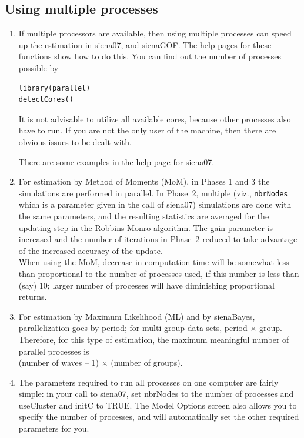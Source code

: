 \documentclass[a4paper,fleqn,11pt]{article}
\newcommand{\+}{\, + \,}
\newcommand{\sfn}[1]{\textsf{#1}}
\begin{document}
\subsection{Using multiple processes}
\label{S_multipleProcesses}
\begin{enumerate}
\item
  If multiple processors are available, then using
  multiple processes can speed up the estimation in \textsf{siena07},
  and \textsf{sienaGOF}.
  The help pages for these functions show how to do this.
  You can find out the number of processes possible by
\begin{verbatim}
library(parallel)
detectCores()
\end{verbatim}
  It is not advisable to utilize all available cores, because
  other processes also have to run. If you are not the only user
  of the machine, then there are obvious issues to be dealt with.

  There are some examples in the help page for \textsf{siena07}.
\item For estimation by Method of Moments (MoM), in Phases 1 and 3
  the simulations are performed in parallel. In Phase~2,
  multiple (viz., \texttt{nbrNodes} which is a parameter
  given in the call of \sfn{siena07}) simulations are done with the same parameters,
  and the resulting statistics are averaged for the updating step in the
  Robbins Monro algorithm. The gain parameter is increased and the
  number of iterations in Phase~2 reduced to take advantage of
  the increased accuracy of the update.\\
  When using the MoM, decrease in computation time will be somewhat less
  than proportional to the number of processes used, if this number is less than
  (say) 10; larger number of processes will have diminishing proportional
  returns.

\item For estimation by Maximum Likelihood (ML) and by \sfn{sienaBayes},
  parallelization goes by period; for multi-group data sets, period $\times$
  group. Therefore, for this type of estimation, the maximum meaningful number
  of parallel processes is \\ (number of waves -- 1) $\times$ (number of groups).

\item The parameters required to run all processes on one computer are fairly
  simple: in your call to \textsf{siena07}, set \sfn{nbrNodes} to the number of
  processes and \sfn{useCluster} and \sfn{initC} to TRUE. The \sfn{Model
    Options} screen also allows you to specify the number of processes, and
  will automatically set the other required parameters for you.


\end{enumerate}
\end{document}
